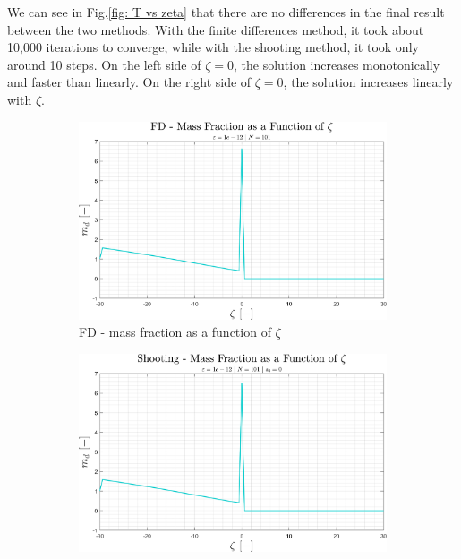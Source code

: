 \documentclass[11pt, a4paper]{article}
\begin{document}
\noindent We can see in Fig.\ref{fig: T vs zeta} that there are no differences in the final result between the two methods. With the finite differences method, it took about 10,000 iterations to converge, while with the shooting method, it took only around 10 steps. On the left side of $\zeta=0$, the solution increases monotonically and faster than linearly. On the right side of $\zeta=0$, the solution increases linearly with $\zeta$.
\begin{figure}[H]
    \centering
    \begin{subfigure}[c]{0.49\textwidth}
        \centering
        \includegraphics[width=\textwidth]{images/FD - md vs zeta.png}
        \caption{FD - mass fraction as a function of $\zeta$}
        \label{fig: FD - md vs zeta}
    \end{subfigure}
    \hfill
    \begin{subfigure}[c]{0.49\textwidth}
        \centering
        \includegraphics[width=\textwidth]{images/shooting - md vs zeta.png}

\end{subfigure}
\end{figure}
\end{document}

